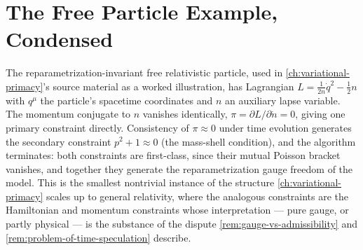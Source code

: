 \documentclass[11pt]{book}
\theoremstyle{plain}
\theoremstyle{definition}
\theoremstyle{remark}
\begin{document}
\section{The Free Particle Example, Condensed}

The reparametrization-invariant free relativistic particle, used in
\cref{ch:variational-primacy}'s source material as a worked
illustration, has Lagrangian $L = \tfrac{1}{2n}\dot q^2 - \tfrac{1}{2}n$
with $q^\mu$ the particle's spacetime coordinates and $n$ an auxiliary
lapse variable. The momentum conjugate to $n$ vanishes identically,
$\pi = \partial L/\partial \dot n = 0$, giving one primary constraint
directly. Consistency of $\pi \approx 0$ under time evolution generates
the secondary constraint $p^2 + 1 \approx 0$ (the mass-shell
condition), and the algorithm terminates: both constraints are
first-class, since their mutual Poisson bracket vanishes, and together
they generate the reparametrization gauge freedom of the model. This
is the smallest nontrivial instance of the structure
\cref{ch:variational-primacy} scales up to general relativity, where
the analogous constraints are the Hamiltonian and momentum constraints
whose interpretation --- pure gauge, or partly physical --- is the
substance of the dispute \cref{rem:gauge-vs-admissibility} and
\cref{rem:problem-of-time-speculation} describe.
\end{document}

